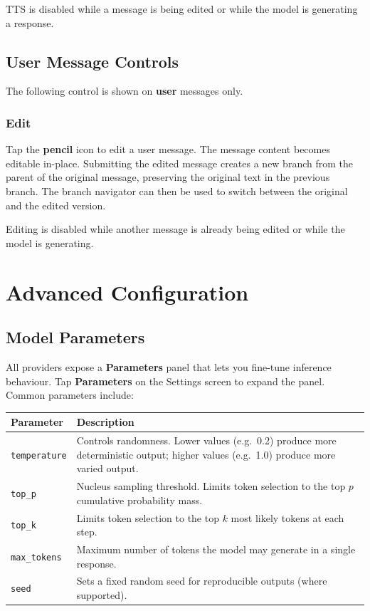 \documentclass[12pt,a4paper]{article}
\begin{document}
TTS is disabled while a message is being edited or while the model is generating a response.

\subsection{User Message Controls}

The following control is shown on \textbf{user} messages only.

\subsubsection{Edit}

Tap the \textbf{pencil} icon to edit a user message. The message content becomes editable in-place. Submitting the edited message creates a new branch from the parent of the original message, preserving the original text in the previous branch. The branch navigator can then be used to switch between the original and the edited version.

Editing is disabled while another message is already being edited or while the model is generating.


\section{Advanced Configuration}

\subsection{Model Parameters}
\label{sec:parameters}

All providers expose a \textbf{Parameters} panel that lets you fine-tune inference behaviour. Tap \textbf{Parameters} on the Settings screen to expand the panel. Common parameters include:

\begin{center}
\begin{tabular}{lp{9cm}}
\toprule
\textbf{Parameter} & \textbf{Description} \\
\midrule
\texttt{temperature} & Controls randomness. Lower values (e.g.\ 0.2) produce more deterministic output; higher values (e.g.\ 1.0) produce more varied output. \\
\texttt{top\_p}      & Nucleus sampling threshold. Limits token selection to the top $p$ cumulative probability mass. \\
\texttt{top\_k}      & Limits token selection to the top $k$ most likely tokens at each step. \\
\texttt{max\_tokens} & Maximum number of tokens the model may generate in a single response. \\
\texttt{seed}        & Sets a fixed random seed for reproducible outputs (where supported). \\
\bottomrule
\end{tabular}
\end{center}
\end{document}
